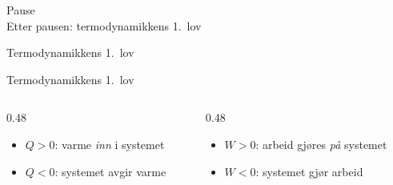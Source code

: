 \documentclass[aspectratio=169, 12pt]{beamer}
\begin{document}
\begin{frame}
\begin{center}
  \Huge{Pause}\\[8pt]
  {\large Etter pausen: termodynamikkens 1.\ lov}
\end{center}
\end{frame}


\begin{frame}{Termodynamikkens 1.\ lov}

  \pause

\end{frame}

\begin{frame}{Termodynamikkens 1.\ lov}

  \pause
  \begin{columns}[T]
    \begin{column}{0.48\textwidth}
      \begin{itemize}
        \item $Q > 0$: varme \textit{inn} i systemet
        \item $Q < 0$: systemet avgir varme
      \end{itemize}
    \end{column}
    \begin{column}{0.48\textwidth}
      \begin{itemize}
        \item $W > 0$: arbeid gjøres \textit{på} systemet
        \item $W < 0$: systemet gjør arbeid
      \end{itemize}
    \end{column}
  \end{columns}

\end{frame}
\end{document}
